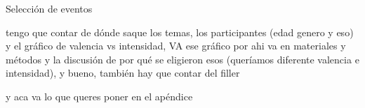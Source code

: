 \begin{apendice}\label{ap:conestelabellocitas}

Selección de eventos

tengo que contar de dónde saque los temas, los participantes (edad genero y eso) y el gráfico de valencia vs intensidad, VA ese gráfico por ahi va en materiales y métodos y la discusión de por qué se eligieron esos (queríamos diferente valencia e intensidad), y bueno, también hay que contar del filler

\end{apendice}

\begin{apendice}\label{ap:otrolabelacitar}
y aca va lo que queres poner en el apéndice
 
\end{apendice}